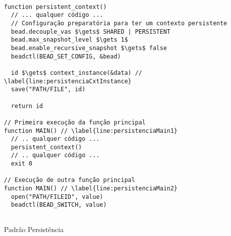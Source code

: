 \begin{pseudocode}
\begin{lstlisting}[language=pseudocode, style=pseudocode]

function persistent_context()
  // ... qualquer código ...
  // Configuração preparatória para ter um contexto persistente
  bead.decouple_vas $\gets$ SHARED | PERSISTENT
  bead.max_snapshot_level $\gets 1$
  bead.enable_recursive_snapshot $\gets$ false
  beadctl(BEAD_SET_CONFIG, &bead)

  id $\gets$ context_instance(&data) // \label{line:persistenciaCxtInstance}
  save("PATH/FILE", id)

  return id

// Primeira execução da função principal
function MAIN() // \label{line:persistenciaMain1}
  // .. qualquer código ...
  persistent_context()
  // .. qualquer código ...
  exit 0

// Execução de outra função principal
function MAIN() // \label{line:persistenciaMain2}
  open("PATH/FILEID", value)
  beadctl(BEAD_SWITCH, value)
  
\end{lstlisting}

  \label{alg:persistencia}
  \caption{Padrão Persistência}
\end{pseudocode}
